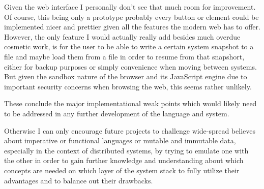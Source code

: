 Given the web interface I personally don't see that much room
for improvement. Of course, this being only a prototype probably every
button or element could be implemented nicer and prettier given all the
features the modern web has to offer. However, the only feature I would
actually really add besides much overdue cosmetic work, is for
the user to be able to write a certain system snapshot to a file
and maybe load them from a file in order to resume from that
snapshort, either for backup purposes or simply convenience
when moving between systems. But given the sandbox nature of
the browser and its JavaScript engine due to important security
concerns when browsing the web, this seems rather unlikely.
\newline

These conclude the major implementational weak points which
would likely need to be addressed in any further development
of the language and system.

Otherwise I can only encourage future projects to challenge
wide-spread believes about imperative or functional languages
or mutable and immutable data, especially in the
context of distributed systems, by trying to emulate one with
the other in order to gain further knowledge and understanding
about which concepts are needed on which layer of the system
stack to fully utilize their advantages and to balance out their drawbacks.


